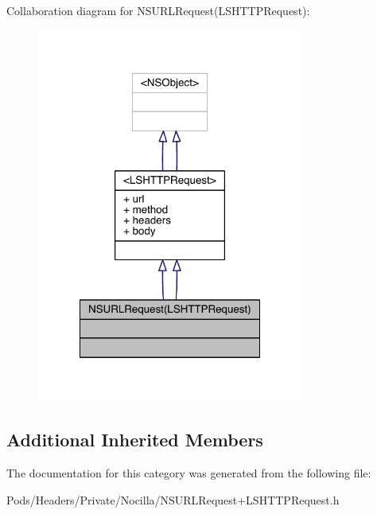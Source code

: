 Collaboration diagram for N\-S\-U\-R\-L\-Request(L\-S\-H\-T\-T\-P\-Request)\-:\nopagebreak
\begin{figure}[H]
\begin{center}
\leavevmode
\includegraphics[width=248pt]{category_n_s_u_r_l_request_07_l_s_h_t_t_p_request_08__coll__graph}
\end{center}
\end{figure}
\subsection*{Additional Inherited Members}


The documentation for this category was generated from the following file\-:\begin{DoxyCompactItemize}
\item 
Pods/\-Headers/\-Private/\-Nocilla/N\-S\-U\-R\-L\-Request+\-L\-S\-H\-T\-T\-P\-Request.\-h\end{DoxyCompactItemize}
